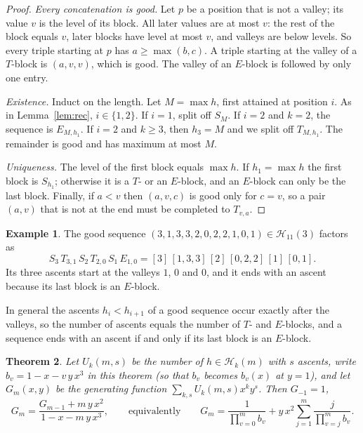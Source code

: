 \documentclass[11pt]{amsart}
\newtheorem{theorem}{Theorem}[section]
\theoremstyle{definition}
\newtheorem{example}[theorem]{Example}
\begin{document}
\begin{proof}
\emph{Every concatenation is good.} Let $p$ be a position that is not a valley; its value $v$ is the level of its block. All later values are at most $v$: the rest of the block equals $v$, later blocks have level at most $v$, and valleys are below levels. So every triple starting at $p$ has $a\ge\max(b,c)$. A triple starting at the valley of a $T$-block is $(a,v,v)$, which is good. The valley of an $E$-block is followed by only one entry.

\emph{Existence.} Induct on the length. Let $M=\max h$, first attained at position $i$. As in Lemma~\ref{lem:rec}, $i\in\{1,2\}$. If $i=1$, split off $S_M$. If $i=2$ and $k=2$, the sequence is $E_{M,h_1}$. If $i=2$ and $k\ge3$, then $h_3=M$ and we split off $T_{M,h_1}$. The remainder is good and has maximum at most $M$.

\emph{Uniqueness.} The level of the first block equals $\max h$. If $h_1=\max h$ the first block is $S_{h_1}$; otherwise it is a $T$- or an $E$-block, and an $E$-block can only be the last block. Finally, if $a<v$ then $(a,v,c)$ is good only for $c=v$, so a pair $(a,v)$ that is not at the end must be completed to $T_{v,a}$.
\end{proof}

\begin{example}\label{ex:blocks}
The good sequence $(3,1,3,3,2,0,2,2,1,0,1)\in \mathcal H_{11}(3)$ factors as
\[
  S_3\,T_{3,1}\,S_2\,T_{2,0}\,S_1\,E_{1,0}=[3]\,[1,3,3]\,[2]\,[0,2,2]\,[1]\,[0,1].
\]
Its three ascents start at the valleys $1$, $0$ and $0$, and it ends with an ascent because its last block is an $E$-block.
\end{example}

In general the ascents $h_i<h_{i+1}$ of a good sequence occur exactly after the valleys, so the number of ascents equals the number of $T$- and $E$-blocks, and a sequence ends with an ascent if and only if its last block is an $E$-block.

\begin{theorem}\label{thm:gfxy}
Let $U_k(m,s)$ be the number of $h\in \mathcal H_k(m)$ with $s$ ascents, write $b_v=1-x-v\,y\,x^3$ in this theorem (so that $b_v$ becomes $b_v(x)$ at $y=1$), and let $G_m(x,y)$ be the generating function $\sum_{k,s}U_k(m,s)x^ky^s$. Then $G_{-1}=1$,
\[
  G_m=\frac{G_{m-1}+m\,y\,x^2}{1-x-m\,y\,x^3},\qquad\text{equivalently}\qquad
  G_m=\frac{1}{\prod_{v=0}^{m}b_v}+y\,x^2\sum_{j=1}^{m}\frac{j}{\prod_{v=j}^{m}b_v}.
\]
\end{theorem}
\end{document}
